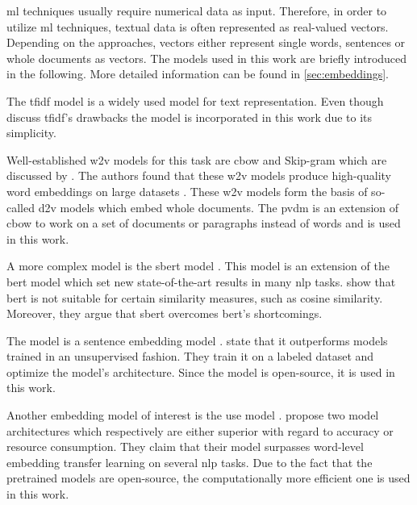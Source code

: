 \ac{ml} techniques usually require numerical data as input.
Therefore, in order to utilize \ac{ml} techniques, textual data is often represented as real-valued vectors.
Depending on the approaches, vectors either represent single words, sentences or whole documents as vectors.
The models used in this work are briefly introduced in the following.
More detailed information can be found in \autoref{sec:embeddings}.

The \acs*{tfidf} model is a widely used model for text representation.
Even though \citeauthor{tfidf2008} discuss \acs*{tfidf}'s drawbacks the model is incorporated in this work due to its simplicity.

Well-established \acs*{w2v} models for this task are \acs*{cbow} and Skip-gram which are discussed by \citeauthor{WordRep2013}.
The authors found that these \acs*{w2v} models produce high-quality word embeddings on large datasets \cite{WordRep2013}.
These \acs*{w2v} models form the basis of so-called \ac{d2v} models which embed whole documents.
The \acs*{pvdm} is an extension of \acs*{cbow} to work on a set of documents or paragraphs instead of words and is used in this work.

A more complex model is the \acs*{sbert} model \cite{HfsentTrans2019}.
This model is an extension of the \acs*{bert} model which set new state-of-the-art results in many \ac{nlp} tasks.
\citeauthor{HfsentTrans2019} show that \acs*{bert} is not suitable for certain similarity measures, such as cosine similarity.
Moreover, they argue that \acs*{sbert} overcomes \acs*{bert}'s shortcomings.

The \infersent{} model is a sentence embedding model \cite{inferSent2018}.
\citeauthor{inferSent2018} state that it outperforms models trained in an unsupervised fashion.
They train it on a labeled dataset and optimize the model's architecture.
Since the model is open-source, it is used in this work.

Another embedding model of interest is the \acs*{use} model \cite{UniversalSentEnc2018}.
\citeauthor{UniversalSentEnc2018} propose two model architectures which respectively are either superior with regard to accuracy or resource consumption.
They claim that their model surpasses word-level embedding transfer learning on several \acs*{nlp} tasks.
Due to the fact that the pretrained models are open-source, the computationally more efficient one is used in this work.